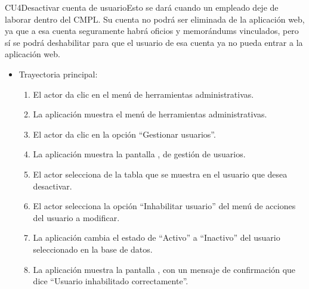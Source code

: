 \newpage
\begin{UseCase}{CU4}{Desactivar cuenta de usuario}{Esto se dará cuando un empleado deje de laborar dentro del CMPL. Su cuenta no podrá ser eliminada de la aplicación web, ya que a esa cuenta seguramente habrá oficios y memorándums vinculados, pero sí se podrá deshabilitar para que el usuario de esa cuenta ya no pueda entrar a la aplicación web.	}
	\end{UseCase}		

			\begin{itemize}
				\item Trayectoria principal:
					\begin{enumerate}
						\item El actor da clic en el menú de herramientas administrativas.
						\item La aplicación muestra el menú de herramientas administrativas.
						\item El actor da clic en la opción ``Gestionar usuarios''.
						\item La aplicación muestra la pantalla , de gestión de usuarios.
						\item El actor selecciona de la tabla que se muestra en  el usuario que desea desactivar.
						\item El actor selecciona la opción ``Inhabilitar usuario'' del menú de acciones del usuario a modificar.
						\item La aplicación cambia el estado de ``Activo'' a ``Inactivo'' del usuario seleccionado en la base de datos.
						\item La aplicación muestra la pantalla , con un mensaje de confirmación que dice ``Usuario inhabilitado correctamente''.
					\end{enumerate}
			\end{itemize}
			
